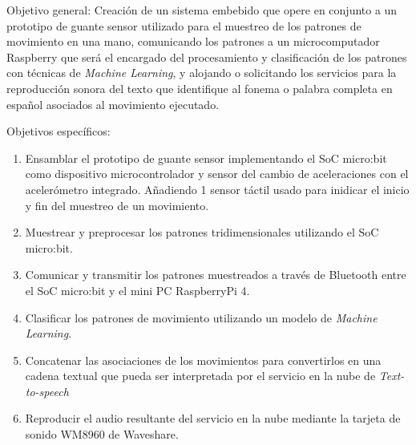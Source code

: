 \hfill\break 
Objetivo general: \hfill\break
Creación de un sistema embebido que opere en conjunto a un prototipo de guante sensor utilizado para el muestreo de los patrones de movimiento en una mano, comunicando los patrones a un microcomputador Raspberry que será el encargado del procesamiento y clasificación de los patrones con técnicas de \textit{Machine Learning}, y alojando o solicitando los servicios para la reproducción sonora del texto que identifique al fonema o palabra completa en español asociados al movimiento ejecutado.

\hfill\break
Objetivos específicos:	
\begin{enumerate}
	
	\item \justifying Ensamblar el prototipo de guante sensor implementando el SoC micro:bit como dispositivo microcontrolador y sensor del cambio de aceleraciones con el acelerómetro integrado. Añadiendo 1 sensor táctil usado para inidicar el inicio y fin del muestreo de un movimiento.

	\item \justifying Muestrear y preprocesar los patrones tridimensionales utilizando el SoC micro:bit.
	
	\item \justifying Comunicar y transmitir los patrones muestreados a través de Bluetooth entre el SoC micro:bit y el mini PC RaspberryPi 4.
	
	\item \justifying Clasificar los patrones de movimiento utilizando un modelo de \textit{Machine Learning}.
	
	\item \justifying Concatenar las asociaciones de los movimientos para convertirlos en una cadena textual que pueda ser interpretada por el servicio en la nube de \textit{Text-to-speech}
	
	\item \justifying Reproducir el audio resultante del servicio en la nube mediante la tarjeta de sonido WM8960 de Waveshare.
\end{enumerate}